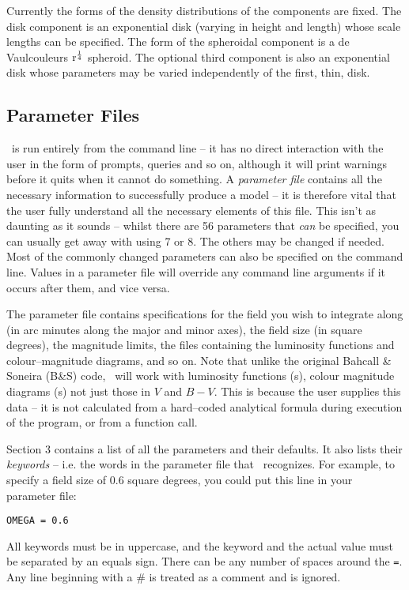 Currently the forms of the density distributions of the components are
fixed. The disk component is an exponential disk (varying in height
and length) whose scale lengths can be specified. The form of the spheroidal 
component is a de Vaulcouleurs ${\rm r}^\frac{1}{4}$ spheroid. The
optional third component is also an exponential disk whose parameters may
be varied independently of the first, thin, disk.

\subsection{Parameter Files}

\egm\ is run entirely from the command line -- it has no direct interaction
with the user in the form of prompts, queries and so on, although it will
print warnings before it quits when it cannot do something. A
{\em parameter file} contains all the necessary information to successfully
produce a model -- it is therefore vital that the user fully understand
all the necessary elements of this file. This isn't as daunting as it 
sounds -- whilst there are 56 parameters that {\em can} be specified, you can
usually get away with using 7 or 8. The others may be changed if needed.
Most of the commonly changed parameters can also be specified on the
command line. Values in a parameter file will override any command line 
arguments if it occurs after them, and vice versa.

The parameter file contains specifications for the field you wish to
integrate along (in arc minutes along the major and minor axes), the field 
size (in square degrees), the magnitude limits, the files containing the
luminosity functions and colour--magnitude diagrams, and so on. 
Note that unlike the original Bahcall \& Soneira (B\&S) code, \egm\ will 
work with luminosity functions (\lf s), colour magnitude diagrams (\cmd s)
not just those in $V$ and $B-V$. This is because the user supplies this 
data -- it is not calculated from a hard--coded analytical formula during 
execution of the program, or from a function call.

Section 3 contains a list of all the parameters and their defaults. 
It also lists their {\em keywords} -- i.e. the words in the parameter file 
that \egm\ recognizes. For example, to specify a field size of 0.6 square 
degrees, you could put this line in your parameter file:
\begin{verbatim}
OMEGA = 0.6
\end{verbatim}
All keywords must be in uppercase, and the keyword and the actual value
must be separated by an equals sign. There can be any number of spaces
around the {\tt =}. Any line beginning with a \# is treated as a comment and is
ignored.

